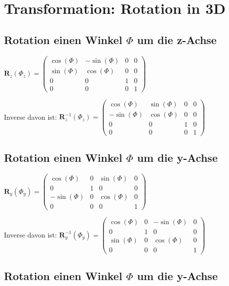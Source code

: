 \section{Transformation: Rotation in 3D}

\subsection{Rotation einen Winkel $\Phi$ um die z-Achse}

$\textbf{R}_z(\Phi_z) = \begin{pmatrix}
\cos (\Phi) & -\sin (\Phi) & 0 & 0\\
\sin (\Phi) & \cos (\Phi) & 0 & 0\\
0 & 0 & 1 & 0\\
0 & 0 & 0 & 1
\end{pmatrix}$

Inverse davon ist:
$\textbf{R}_z^{-1}(\Phi_z) = \begin{pmatrix}
\cos (\Phi) & \sin (\Phi) & 0 & 0\\
-\sin (\Phi) & \cos (\Phi) & 0 & 0\\
0 & 0 & 1 & 0\\
0 & 0 & 0 & 1
\end{pmatrix}$

\subsection{Rotation einen Winkel $\Phi$ um die y-Achse}

$\textbf{R}_y(\Phi_y) = \begin{pmatrix}
\cos (\Phi) & 0 & \sin (\Phi) & 0\\
0 & 1 & 0 & 0\\
-\sin (\Phi) & 0 & \cos (\Phi) & 0\\
0 & 0 & 0 & 1
\end{pmatrix}$

Inverse davon ist:
$\textbf{R}_y^{-1}(\Phi_y) = \begin{pmatrix}
\cos (\Phi) & 0 & -\sin (\Phi) & 0\\
0 & 1 & 0 & 0\\
\sin (\Phi) & 0 & \cos (\Phi) & 0\\
0 & 0 & 0 & 1
\end{pmatrix}$

\subsection{Rotation einen Winkel $\Phi$ um die y-Achse}

